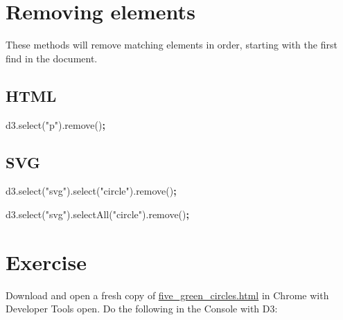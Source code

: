 \documentclass[openany]{book}
\newenvironment{Shaded}{\begin{snugshade}}{\end{snugshade}}
\newcommand{\AttributeTok}[1]{\textcolor[rgb]{0.77,0.63,0.00}{#1}}
\newcommand{\NormalTok}[1]{#1}
\newcommand{\OperatorTok}[1]{\textcolor[rgb]{0.81,0.36,0.00}{\textbf{#1}}}
\newcommand{\StringTok}[1]{\textcolor[rgb]{0.31,0.60,0.02}{#1}}
\newcommand{\VariableTok}[1]{\textcolor[rgb]{0.00,0.00,0.00}{#1}}
\begin{document}
\hypertarget{removing-elements}{%
\section{Removing elements }\label{removing-elements}}

These methods will remove matching elements in order, starting with the first find in the document.

\hypertarget{html-2}{%
\subsection{HTML}\label{html-2}}

\begin{Shaded}
\begin{Highlighting}[]
\VariableTok{d3}\NormalTok{.}\AttributeTok{select}\NormalTok{(}\StringTok{"p"}\NormalTok{).}\AttributeTok{remove}\NormalTok{()}\OperatorTok{;}
\end{Highlighting}
\end{Shaded}

\hypertarget{svg-2}{%
\subsection{SVG}\label{svg-2}}

\begin{Shaded}
\begin{Highlighting}[]
\VariableTok{d3}\NormalTok{.}\AttributeTok{select}\NormalTok{(}\StringTok{"svg"}\NormalTok{).}\AttributeTok{select}\NormalTok{(}\StringTok{"circle"}\NormalTok{).}\AttributeTok{remove}\NormalTok{()}\OperatorTok{;}

\VariableTok{d3}\NormalTok{.}\AttributeTok{select}\NormalTok{(}\StringTok{"svg"}\NormalTok{).}\AttributeTok{selectAll}\NormalTok{(}\StringTok{"circle"}\NormalTok{).}\AttributeTok{remove}\NormalTok{()}\OperatorTok{;}
\end{Highlighting}
\end{Shaded}

\hypertarget{exercise-2}{%
\section{Exercise }\label{exercise-2}}

Download and open a fresh copy of \href{https://raw.githubusercontent.com/jtr13/d3book/master/code/five_green_circles.html}{five\_green\_circles.html} in Chrome with Developer Tools open. Do the following in the Console with D3:
\end{document}
